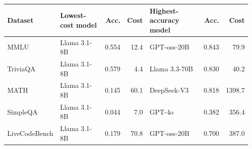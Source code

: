 \begin{tabular}{l l rr l rr}
\toprule
Dataset & Lowest-cost model & Acc. & Cost & Highest-accuracy model & Acc. & Cost \\
\midrule
MMLU & Llama 3.1-8B & 0.554 & 12.4 & GPT-oss-20B & 0.843 & 79.9 \\
TriviaQA & Llama 3.1-8B & 0.579 & 4.4 & Llama 3.3-70B & 0.830 & 40.2 \\
MATH & Llama 3.1-8B & 0.145 & 60.1 & DeepSeek-V3 & 0.818 & 1398.7 \\
SimpleQA & Llama 3.1-8B & 0.044 & 7.0 & GPT-4o & 0.382 & 356.4 \\
LiveCodeBench & Llama 3.1-8B & 0.179 & 70.8 & GPT-oss-20B & 0.700 & 387.0 \\
\bottomrule
\end{tabular}
